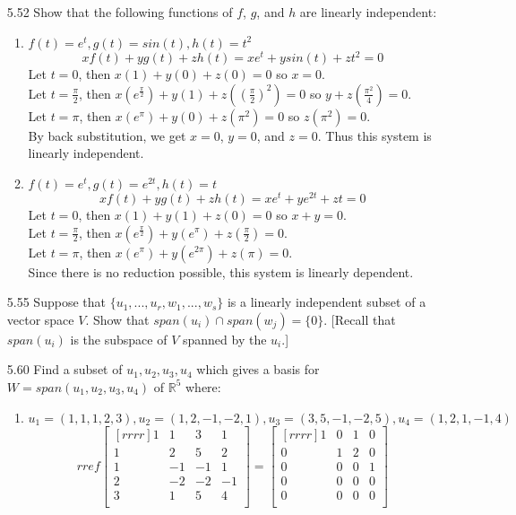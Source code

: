\documentclass[12pt]{article}
\begin{document}
\begin{enumerate}
\item[5.52] Show that the following functions of $f$, $g$, and $h$ are linearly independent:
	\begin{enumerate}
	\item $f(t)=e^t,g(t)=sin(t),h(t)=t^2$
		\[ xf(t)+yg(t)+zh(t) = xe^t+ysin(t)+zt^2 = 0 \]
		Let $t=0$, then $x(1)+y(0)+z(0) = 0$ so $x=0$.\\
		Let $t=\frac{\pi}{2}$, then $x(e^{\frac{\pi}{2}})+y(1)+z((\frac{\pi}{2})^2)=0$ so $y+z(\frac{\pi^2}{4})=0$.\\
		Let $t=\pi$, then $x(e^{\pi})+y(0)+z(\pi^2)=0$ so $z(\pi^2)=0$.\\
		By back substitution, we get $x=0$, $y=0$, and $z=0$. Thus this system is linearly independent.
	\item $f(t)=e^t,g(t)=e^{2t},h(t)=t$
	\[ xf(t)+yg(t)+zh(t) = xe^t+ye^{2t}+zt = 0 \]
	Let $t=0$, then $x(1)+y(1)+z(0) = 0$ so $x+y=0$.\\
	Let $t=\frac{\pi}{2}$, then $x(e^{\frac{\pi}{2}})+y(e^{\pi})+z(\frac{\pi}{2}) = 0$.\\
	Let $t=\pi$, then $x(e^\pi)+y(e^{2\pi})+z(\pi)=0$.\\
	Since there is no reduction possible, this system is linearly dependent.
	\end{enumerate}
\item[5.55] Suppose that $\{u_1,...,u_r,w_1,...,w_s\}$ is a linearly independent subset of a vector space $V$. Show that $span(u_i) \cap span(w_j)=\{0\}$. [Recall that $span(u_i)$ is the subspace of $V$ spanned by the $u_i$.]
\item[5.60] Find a subset of $u_1,u_2,u_3,u_4$ which gives a basis for $W=span(u_1,u_2,u_3,u_4)$ of $\mathbb{R}^5$ where:
	\begin{enumerate}
	\item $u_1=(1,1,1,2,3),u_2=(1,2,-1,-2,1),u_3=(3,5,-1,-2,5),u_4=(1,2,1,-1,4)$
		\[ rref\begin{bmatrix}[rrrr]1&1&3&1\\1&2&5&2\\1&-1&-1&1\\2&-2&-2&-1\\3&1&5&4\\\end{bmatrix} = \begin{bmatrix}[rrrr]1&0&1&0\\0&1&2&0\\0&0&0&1\\0&0&0&0\\0&0&0&0\\\end{bmatrix} \]

\end{enumerate}
\end{enumerate}
\end{document}
